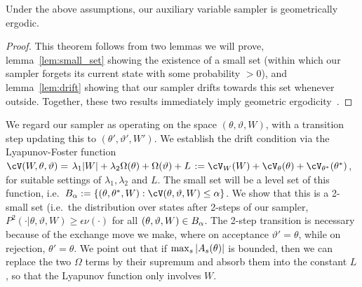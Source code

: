 \begin{theorem}
Under the above assumptions, our auxiliary variable sampler is
geometrically ergodic.  \label{thm:geom_erg} 
\end{theorem}
\begin{proof}
\noindent This theorem follows from two lemmas we will prove, 
lemma~\ref{lem:small_set} showing the existence of a small set (within 
which our sampler forgets its 
current state with some probability $>0$), and lemma~\ref{lem:drift}
showing that our sampler drifts towards this set whenever 
outside. Together, these two results immediately imply geometric 
ergodicity~\citep[Theorems 15.0.1 and Lemma 15.2.8]{meyn2009markov}.
\end{proof}
We regard our sampler as operating on the space $(\theta,\vartheta,W)$, 
with a transition step updating this to $(\theta',\vartheta',W')$. 
We establish the drift condition via the Lyapunov-Foster function
$\cV(W,\theta,\vartheta) = \left. \lambda_1|W| + \lambda_2 \Omega(\theta) +
\Omega(\vartheta) +L \right. := \cV_W(W) + \cV_{\theta}(\theta) + 
\cV_{\theta^*}(\theta^*)$, for suitable settings of $\lambda_1,
  \lambda_2$ and $L$.
The small set will be a level set of this function, i.e.\ 
$\SM_\alpha := \{(\theta,\theta^*,W): \cV(\theta,\vartheta,W) \le \alpha\}$.
We show that this is a 2-small set (i.e.\ the distribution over states
after 2-steps of our sampler, $P^2(\cdot|\theta,\vartheta,W) \ge \epsilon 
\nu(\cdot)$ for all $(\theta,\vartheta,W) \in B_\alpha$. 
The 2-step transition is necessary because of the exchange move we make, 
where on acceptance $\vartheta'=\theta$, while on rejection, $\theta'=\theta$.
We point out that if ${\max_s |A_s(\theta)|}$ is bounded, then we can replace
the two $\Omega$ terms by their supremum and absorb them into the 
constant $L$, so that the Lyapunov function only involves $W$.


